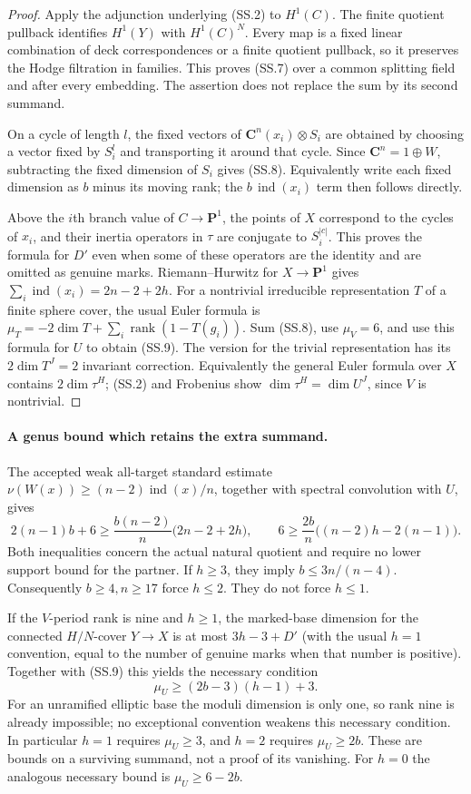 \begin{proof}
Apply the adjunction underlying (SS.2) to $H^1(C)$.
The finite quotient pullback identifies $H^1(Y)$ with
$H^1(C)^N$.  Every map is a fixed linear combination of deck
correspondences or a finite quotient pullback, so it preserves
the Hodge filtration in families.  This proves (SS.7) over a
common splitting field and after every embedding.  The assertion
does not replace the sum by its second summand.

On a cycle of length $l$, the fixed vectors of
$\mathbf C^n(x_i)\otimes S_i$ are obtained by choosing a vector
fixed by $S_i^l$ and transporting it around that cycle.
Since $\mathbf C^n=1\oplus W$, subtracting the fixed dimension
of $S_i$ gives (SS.8).  Equivalently write each fixed dimension
as $b$ minus its moving rank; the $b\,\operatorname{ind}(x_i)$
term then follows directly.

Above the $i$th branch value of $C\to\mathbf P^1$, the points
of $X$ correspond to the cycles of $x_i$, and their inertia
operators in $\tau$ are conjugate to $S_i^{|c|}$.
This proves the formula for $D'$ even when some of these
operators are the identity and are omitted as genuine marks.
Riemann--Hurwitz for $X\to\mathbf P^1$ gives
$\sum_i\operatorname{ind}(x_i)=2n-2+2h$.
For a nontrivial irreducible representation $T$ of a finite
sphere cover, the usual Euler formula is
$\mu_T=-2\dim T+\sum_i\operatorname{rank}(1-T(g_i))$.
Sum (SS.8), use $\mu_V=6$, and use this formula for $U$ to obtain
(SS.9).  The version for the trivial representation has its
$2\dim T^J=2$ invariant correction.  Equivalently the general
Euler formula over $X$ contains $2\dim\tau^H$; (SS.2) and
Frobenius show $\dim\tau^H=\dim U^J$, since $V$ is nontrivial.
\end{proof}

\paragraph{A genus bound which retains the extra summand.}
The accepted weak all-target standard estimate
$\nu(W(x))\ge (n-2)\operatorname{ind}(x)/n$, together with
spectral convolution with $U$, gives
\[
 2(n-1)b+6
  \ge\frac{b(n-2)}n\bigl(2n-2+2h\bigr),\qquad
 6\ge\frac{2b}{n}\bigl((n-2)h-2(n-1)\bigr).
 \tag{SS.15}
\]
Both inequalities concern the actual natural quotient and require
no lower support bound for the partner.  If $h\ge3$, they imply
$b\le3n/(n-4)$.  Consequently $b\ge4,n\ge17$ force $h\le2$.
They do not force $h\le1$.

If the $V$-period rank is nine and $h\ge1$, the marked-base
dimension for the connected $H/N$-cover $Y\to X$ is at most
$3h-3+D'$ (with the usual $h=1$ convention, equal to the
number of genuine marks when that number is positive).
Together with (SS.9) this yields the necessary condition
\[
               \mu_U\ge (2b-3)(h-1)+3.
 \tag{SS.16}
\]
For an unramified elliptic base the moduli dimension is only one,
so rank nine is already impossible; no exceptional convention
weakens this necessary condition.  In particular $h=1$ requires
$\mu_U\ge3$, and $h=2$ requires $\mu_U\ge2b$.
These are bounds on a surviving summand, not a proof of its
vanishing.  For $h=0$ the analogous necessary bound is
$\mu_U\ge6-2b$.


